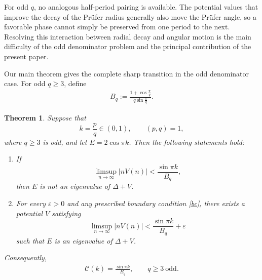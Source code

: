 \documentclass[12pt]{amsart}
\theoremstyle{plain}
\newtheorem{theorem}{Theorem}[section]
\theoremstyle{definition}
\begin{document}
For odd $q$, no analogous half-period pairing is available. The potential values that improve the decay of the Pr\"ufer radius generally also move the Pr\"ufer angle, so a favorable phase cannot simply be preserved from one period to the next. Resolving this interaction between radial decay and angular motion is the main difficulty of the odd denominator problem and the principal contribution of the present paper.

Our main theorem gives the complete sharp transition in the odd denominator case.
For odd $q\geq3$, define
\begin{align}\label{bqb}
	B_q:=\frac{1+\cos\frac{\pi}{q}}{q\sin\frac{\pi}{q}}.
\end{align}
\begin{theorem}\label{main}	Suppose that
	\[
	k=\frac pq\in(0,1),
	\qquad (p,q)=1,
	\]
	where $q\geq3$ is odd, and let $E=2\cos\pi k$. Then the following statements hold:
	\begin{enumerate}
		\item[(i)]  If
		\[
		\limsup_{n\to\infty}|nV(n)|
		<
		\frac{\sin\pi k}{B_q},
		\]
		then $E$ is not an eigenvalue of $\Delta+V$.
		
		\item[(ii)]  For every $\varepsilon>0$ and any prescribed boundary condition \eqref{bc}, there exists a potential $V$ satisfying
		\[
		\limsup_{n\to\infty}|nV(n)|
		<
		\frac{\sin\pi k}{B_q}+\varepsilon
		\]
		such that $E$ is an eigenvalue of $\Delta+V$.
	\end{enumerate}
	Consequently,
	\begin{align}
		\mathcal C(k)
		=
		\frac{\sin\pi k}{B_q},
		\qquad q\geq3\ \text{odd}.
		\nonumber
	\end{align}
\end{theorem}
\end{document}
